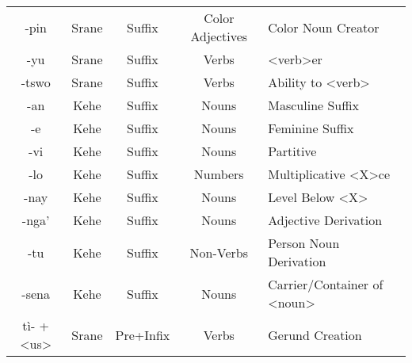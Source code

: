 \begin{center}
\begin{longtable}[c]{|c c c c l|}
{-pin} & Srane & Suffix & Color Adjectives & Color Noun Creator\\
{-yu} & Srane & Suffix & Verbs & <verb>er\\
{-tswo} & Srane & Suffix & Verbs & Ability to <verb>\\
{-an} & Kehe & Suffix & Nouns & Masculine Suffix\\
{-e} & Kehe & Suffix & Nouns & Feminine Suffix\\
{-vi} & Kehe & Suffix & Nouns & Partitive\\
{-lo} & Kehe & Suffix & Numbers & Multiplicative <X>ce\\
{-nay} & Kehe & Suffix & Nouns & Level Below <X>\\
{-nga'} & Kehe & Suffix & Nouns & Adjective Derivation\\
{-tu} & Kehe & Suffix & Non-Verbs & Person Noun Derivation\\
{-sena} & Kehe & Suffix & Nouns & Carrier/Container of <noun>\\
{tì- + <us>} & Srane & Pre+Infix & Verbs & Gerund Creation\\
\end{longtable}
\end{center}
\normalsize